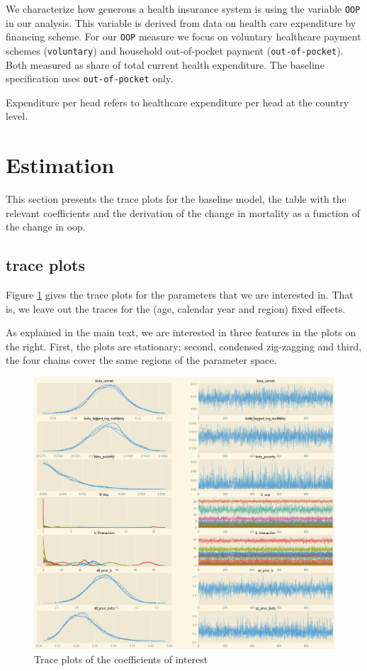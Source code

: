 \documentclass[a4paper,12pt]{article}
\begin{document}
We characterize how generous a health insurance system is using the variable \texttt{OOP} in our analysis. This variable is derived from data on health care expenditure by financing scheme. For our \texttt{OOP} measure we focus on voluntary healthcare payment schemes (\texttt{voluntary}) and household out-of-pocket payment (\texttt{out-of-pocket}). Both measured as share of total current health expenditure. The baseline specification uses \texttt{out-of-pocket} only.

Expenditure per head refers to healthcare expenditure per head at the country level.

\section{Estimation}
\label{sec:orga940b55}

This section presents the trace plots for the baseline model, the table with the relevant coefficients and the derivation of the change in mortality as a function of the change in oop.

\subsection{trace plots}
\label{sec:org800aee2}

Figure \ref{fig:Trace} gives the trace plots for the parameters that we are interested in. That is, we leave out the traces for the (age, calendar year and region) fixed effects.

As explained in the main text, we are interested in three features in the plots on the right. First, the plots are stationary; second, condensed zig-zagging and third, the four chains cover the same regions of the parameter space.

\begin{figure}[htbp]
\centering
\includegraphics[width=.9\linewidth]{./figures/trace_plot_baseline.png}
\caption{\label{fig:Trace}Trace plots of the coefficients of interest}
\end{figure}
\end{document}
